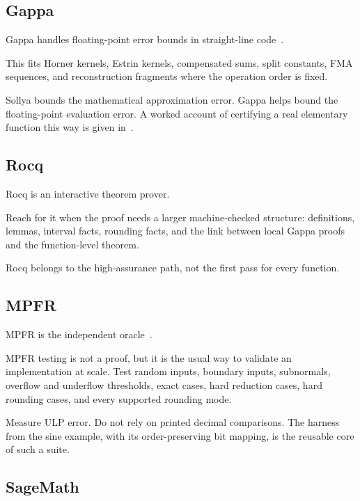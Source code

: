 \documentclass[manuscript, nonacm]{acmart}
\begin{document}
    \subsection{Gappa}

    Gappa handles floating-point error bounds in straight-line
    code~\cite{gappapaper}.

    This fits Horner kernels, Estrin kernels, compensated sums, split constants,
    FMA sequences, and reconstruction fragments where the operation order is
    fixed.

    Sollya bounds the mathematical approximation error. Gappa helps bound the
    floating-point evaluation error. A worked account of certifying a real
    elementary function this way is given in~\cite{gappacert}.

    \subsection{Rocq}

    Rocq is an interactive theorem prover.

    Reach for it when the proof needs a larger machine-checked structure: definitions,
    lemmas, interval facts, rounding facts, and the link between local Gappa
    proofs and the function-level theorem.

    Rocq belongs to the high-assurance path, not the first pass for every
    function.

    \subsection{MPFR}

    MPFR is the independent oracle~\cite{mpfrpaper}.

    MPFR testing is not a proof, but it is the usual way to validate an
    implementation at scale. Test random inputs, boundary inputs, subnormals,
    overflow and underflow thresholds, exact cases, hard reduction cases, hard
    rounding cases, and every supported rounding mode.

    Measure ULP error. Do not rely on printed decimal comparisons. The
    harness from the sine example, with its order-preserving bit mapping, is
    the reusable core of such a suite.

    \subsection{SageMath}
\end{document}
